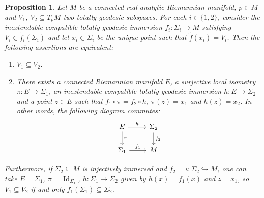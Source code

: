 \documentclass[11pt,a4paper,final]{amsart}
\renewcommand{\tilde}{\widetilde}
\newtheorem{proposition}[theorem]{Proposition}
\theoremstyle{definition}
\begin{document}
\begin{proposition}\label{prop:TGInclusions}
	Let $M$ be a connected real analytic Riemannian manifold, $p\in M$ and $V_{1}$, $V_{2}\subseteq T_{p}M$ two totally geodesic subspaces.
	For each $i\in \{1,2\}$, consider the inextendable compatible totally geodesic immersion $f_{i}\colon \Sigma_{i}\to M$ satisfying $V_{i}\in \tilde{f}_{i}(\Sigma_{i})$ and let $x_{i}\in\Sigma_{i}$ be the unique point such that $\tilde{f}(x_{i})=V_{i}$.
	Then the following assertions are equivalent:
	\begin{enumerate}[\rm (i)]
		\item\label{propItem:SubspaceInclusion} $V_{1}\subseteq V_{2}$.
		\item\label{propItem:ImmersionInclusion} There exists a connected Riemannian manifold $E$, a surjective local isometry $\pi\colon E\to \Sigma_{1}$, an inextendable compatible totally geodesic immersion $h\colon E\to \Sigma_{2}$ and a point $z\in E$ such that $f_{1}\circ \pi=f_{2}\circ h$, $\pi(z)=x_{1}$ and $h(z)=x_{2}$.
		In other words, the following diagram commutes:
		\[
			\begin{tikzcd}
				E \arrow[r, "h"] \arrow[d, "\pi"] & \Sigma_{2} \arrow[d, "f_{2}"] \\
				\Sigma_{1} \arrow[r, "f_{1}"]     & M                            
			\end{tikzcd}
		\]
	\end{enumerate}
	
	Furthermore, if $\Sigma_{2}\subseteq M$ is injectively immersed and $f_{2}=\iota \colon \Sigma_{2}\hookrightarrow M$, one can take $E=\Sigma_{1}$, $\pi=\operatorname{Id}_{\Sigma_{1}}$, $h\colon \Sigma_{1}\to\Sigma_{2}$ given by $h(x)=f_{1}(x)$ and $z=x_{1}$, so $V_{1}\subseteq V_{2}$ if and only $f_{1}(\Sigma_{1})\subseteq \Sigma_{2}$.
\end{proposition}
\end{document}
